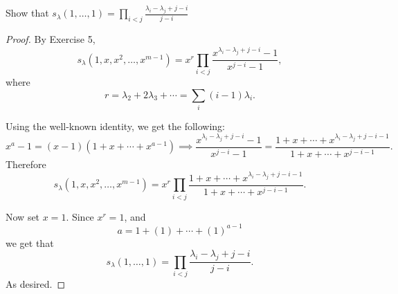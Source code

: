\documentclass[addpoints,10pt]{exam}
\theoremstyle{plain}
\theoremstyle{definition}
\newtheorem{prob}[thm]{Problem}
\theoremstyle{plain}
\theoremstyle{plain}
\theoremstyle{definition}
\let\oldprob\prob
\let\endoldprob\endprob
\renewenvironment{prob}
  {\begin{singlespace}\oldprob}
  {\endoldprob\end{singlespace}}
\begin{document}
\newpage
\setcounter{thm}{5}
\renewcommand{\thethm}{6.\arabic{thm}}

\begin{prob}
Show that $s_{\lambda}(1,\hdots, 1)=\prod_{i<j}\frac{\lambda_{i}-\lambda_{j}+j-i}{j-i}$
\end{prob}
\begin{proof}
By Exercise 5,
\[
s_{\lambda}(1,x,x^2,\ldots,x^{m-1})
=
x^r\prod_{i<j}
\frac{x^{\lambda_i-\lambda_j+j-i}-1}{x^{j-i}-1},
\]
where
\[
r=\lambda_2+2\lambda_3+\cdots=\sum_i(i-1)\lambda_i.
\]

Using the well-known identity, we get the following:
\[
x^a-1=(x-1)(1+x+\cdots+x^{a-1})\implies 
\frac{x^{\lambda_i-\lambda_j+j-i}-1}{x^{j-i}-1}
=
\frac{1+x+\cdots+x^{\lambda_i-\lambda_j+j-i-1}}
{1+x+\cdots+x^{j-i-1}}.
\]
Therefore
\[
s_{\lambda}(1,x,x^2,\ldots,x^{m-1})
=
x^r
\prod_{i<j}
\frac{1+x+\cdots+x^{\lambda_i-\lambda_j+j-i-1}}
{1+x+\cdots+x^{j-i-1}}.
\]

Now set \(x=1\). Since \(x^r=1\), and
\[
a= 1+(1)+\cdots+(1)^{a-1}
\]
we get that
\[
s_{\lambda}(1,\ldots,1)
=
\prod_{i<j}
\frac{\lambda_i-\lambda_j+j-i}{j-i}.
\]
As desired.

\end{proof}
\end{document}
